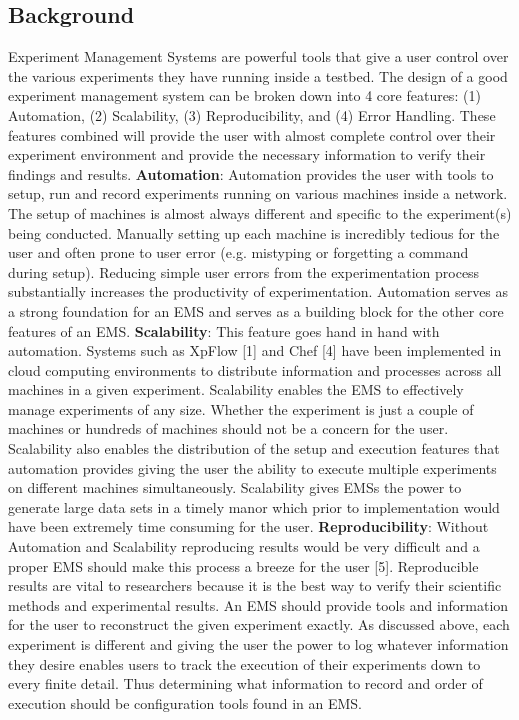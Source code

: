 \documentclass[12pt, letterpaper]{article}
\begin{document}
\begin{multicols}{2}
\section{Background}
Experiment Management Systems are powerful tools that give a user control over the various experiments they have running inside a testbed.  The design of a good experiment management system can be broken down into 4 core features:
(1) Automation, (2) Scalability, (3) Reproducibility, and (4) Error Handling. These features combined will provide the user with almost complete control over their experiment environment and provide the necessary information to verify their findings and results. \newline
\textbf{Automation}: Automation provides the user with tools to setup, run and record experiments running on various machines inside a network.  The setup of machines is almost always different and specific to the experiment(s) being conducted.  Manually setting up each machine is incredibly tedious for the user and often prone to user error (e.g. mistyping or forgetting a command during setup).  Reducing simple user errors from the experimentation process substantially increases the productivity of experimentation.  Automation serves as a strong foundation for an EMS and serves as a building block for the other core features of an EMS.\newline
\textbf{Scalability}:  This feature goes hand in hand with automation.  Systems such as XpFlow [1] and Chef [4] have been implemented in cloud computing environments to distribute information and processes across all machines in a given experiment.  Scalability enables the EMS to effectively manage experiments of any size.  Whether the experiment is just a couple of machines or hundreds of machines should not be a concern for the user.  Scalability also enables the distribution of the setup and execution features that automation provides giving the user the ability to execute multiple experiments on different machines simultaneously.  Scalability gives EMSs the power to generate large data sets in a timely manor which prior to implementation would have been extremely time consuming for the user.\newline
\textbf{Reproducibility}: Without Automation and Scalability reproducing results would be very difficult and a proper EMS should make this process a breeze for the user [5].  Reproducible results are vital to researchers because it is the best way to verify their scientific methods and experimental results.  An EMS should provide tools and information for the user to reconstruct the given experiment exactly. As discussed above, each experiment is different and giving the user the power to log whatever information they desire enables users to track the execution of their experiments down to every finite detail. Thus determining what information to record and order of execution should be configuration tools found in an EMS.\newline

\end{multicols}
\end{document}
